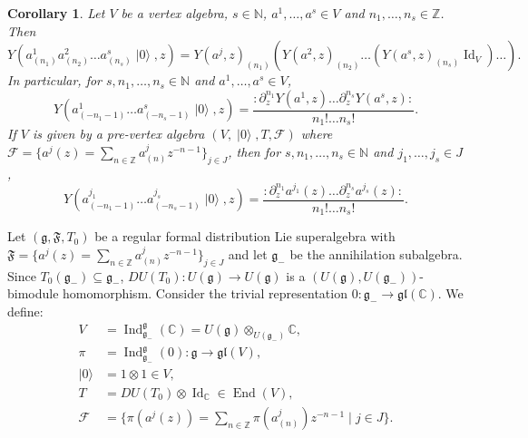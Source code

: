 \documentclass[a4paper, 12pt, reqno]{amsart}
\newtheorem{corollary}[theorem]{Corollary}
\theoremstyle{remark}
\numberwithin{equation}{subsection}
\DeclareMathOperator{\Id}{Id}
\DeclareMathOperator{\End}{End}
\DeclareMathOperator{\Ind}{Ind}
\DeclareMathOperator{\vac}{|0\rangle}
\begin{document}
\begin{corollary}
  \label{crl:1}
  Let $V$ be a vertex algebra, $s \in \mathbb{N}$, $a^1, \dots, a^s \in V$ and $n_1, \dots, n_s \in \mathbb{Z}$.
  Then 
  \begin{equation*}
    Y(a^1_{(n_1)}a^2_{(n_2)}\dots a^s_{(n_s)}\vac, z) = Y(a^j, z)_{(n_1)}(Y(a^2, z)_{(n_2)}\dots (Y(a^s, z)_{(n_s)}\Id_V)\dots).
  \end{equation*}
  In particular, for $s, n_1, \dots, n_s \in \mathbb{N}$ and $a^1, \dots, a^s \in V$,
  \begin{equation}
    \label{eq:17}
    Y(a^1_{(-n_1 - 1)}\dots a^s_{(-n_s - 1)}\vac, z) = \frac{:\partial^{n_1}_zY(a^1,z)\dots \partial^{n_s}_zY(a^s,z):}{n_1!\dots n_s!}.
  \end{equation}
  If $V$ is given by a pre-vertex algebra $(V, \vac, T, \mathcal{F})$ where $\mathcal{F} = \{a^j(z) = \sum_{n \in \mathbb{Z}}a^j_{(n)}z^{-n - 1}\}_{j \in J}$, then for $s, n_1, \dots, n_s \in \mathbb{N}$ and $j_1, \dots, j_s \in J$,
  \begin{equation}
    \label{eq:18}
    Y(a^{j_1}_{(-n_1 - 1)}\dots a^{j_s}_{(-n_s - 1)}\vac, z) = \frac{:\partial^{n_1}_za^{j_1}(z)\dots \partial^{n_s}_za^{j_s}(z):}{n_1!\dots n_s!}.
  \end{equation}
\end{corollary}

Let $(\mathfrak{g}, \mathfrak{F}, T_0)$ be a regular formal distribution Lie superalgebra with $\mathfrak{F} = \{a^j(z) = \sum_{n \in \mathbb{Z}}a^j_{(n)}z^{-n - 1}\}_{j \in J}$ and let $\mathfrak{g}_-$ be the annihilation subalgebra.
Since $T_0(\mathfrak{g}_-) \subseteq \mathfrak{g}_-$, $DU(T_0): U(\mathfrak{g}) \to U(\mathfrak{g})$ is a $(U(\mathfrak{g}), U(\mathfrak{g}_-))$-bimodule homomorphism.
Consider the trivial representation $0: \mathfrak{g}_- \to \mathfrak{gl}(\mathbb{C})$.
We define:
\begin{align*}
  V &= \Ind^{\mathfrak{g}}_{\mathfrak{g}_-}(\mathbb{C}) = U(\mathfrak{g}) \otimes_{U(\mathfrak{g}_-)} \mathbb{C}, \\
  \pi &= \Ind^{\mathfrak{g}}_{\mathfrak{g}_-}(0): \mathfrak{g} \to \mathfrak{gl}(V), \\
  \vac &= 1\otimes1 \in V, \\
  T &= DU(T_0) \otimes \Id_{\mathbb{C}} \in \End(V), \\
  \mathcal{F} &= \{\pi(a^j(z)) = \sum_{n \in \mathbb{Z}}\pi(a^j_{(n)})z^{-n - 1} \mid j \in J\}.
\end{align*}
\end{document}
